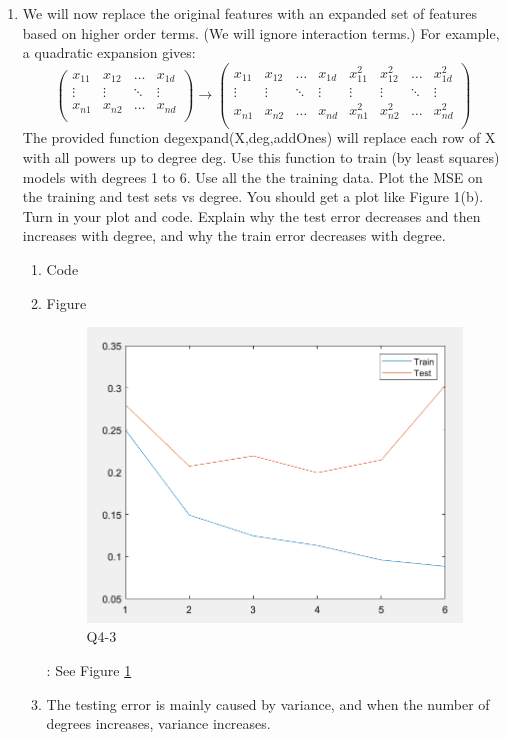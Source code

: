 \documentclass[11pt]{article}
\newcommand{\mfile}[1]  {{\small }} %
\begin{document}
\begin{enumerate}
	\item We will now replace the original features with an expanded set of features based on higher order terms. (We
	will ignore interaction terms.) For example, a quadratic expansion gives:
	\begin{equation}
		\begin{pmatrix}
			x_{11} & x_{12} & \dots & x_{1d} \\
			\vdots& \vdots & \ddots & \vdots \\
			x_{n1}& x_{n2} & \dots & x_{nd} \\
		\end{pmatrix}\xrightarrow[]{}\begin{pmatrix}
			x_{11} & x_{12} & \dots & x_{1d}& x_{11}^2 & x_{12}^2 & \dots & x_{1d}^2\\
			\vdots& \vdots & \ddots & \vdots&\vdots& \vdots & \ddots & \vdots \\
			x_{n1}& x_{n2} & \dots & x_{nd}& x_{n1}^2& x_{n2}^2 & \dots & x_{nd}^2\\
		\end{pmatrix}
	\end{equation}
The provided function degexpand(X,deg,addOnes) will replace each row of X with all powers up to degree deg. Use
this function to train (by least squares) models with degrees 1 to 6. Use all the the training data. Plot the MSE on
the training and test sets vs degree. You should get a plot like Figure 1(b). Turn in your plot and code. Explain
why the test error decreases and then increases with degree, and why the train error decreases with degree.
	\begin{enumerate}
		\item Code \mfile{q3.m}
		\item Figure
		\begin{figure}[h!]
			\centering
			\includegraphics[width=0.5\linewidth]{Q43.png}
			\caption{Q4-3}
			\label{fig:Q4_3}
		\end{figure}:
		See Figure \ref{fig:Q4_3}
		\item The testing error is mainly caused by variance, and when the number of degrees increases, variance increases.
	\end{enumerate}


\end{enumerate}
\end{document}
